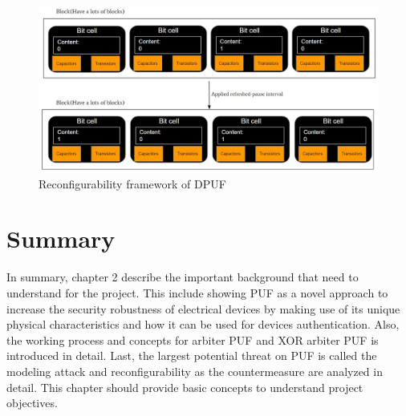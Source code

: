 \begin{figure}[htp]
    \centering
    \includegraphics[width=18cm]{figures/figure9.jpg}
    \caption{Reconfigurability framework of DPUF}
    \label{fig:figure9}
    \end{figure}

\section{Summary}
In summary, chapter 2 describe the important background that need to understand for the project. This include showing PUF as a novel approach to increase the security robustness of electrical devices 
by making use of its unique physical characteristics and how it can be used for devices authentication. Also, the working process and concepts for arbiter PUF and XOR arbiter PUF is introduced in 
detail. Last, the largest potential threat on PUF is called the modeling attack and reconfigurability as the countermeasure are analyzed in detail. This chapter should provide basic concepts to understand 
project objectives.


